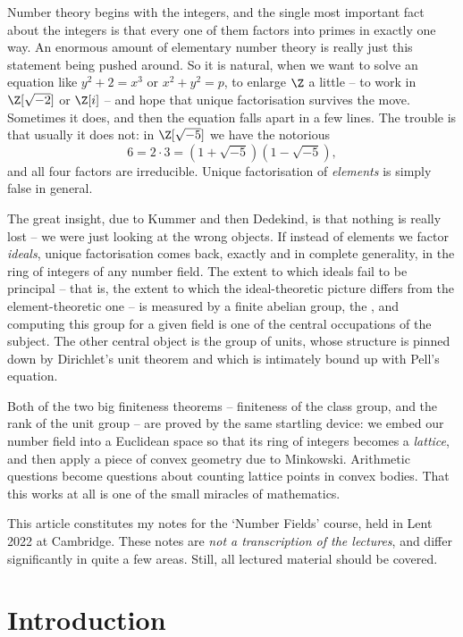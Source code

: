 



Number theory begins with the integers, and the single most important fact about the integers is that every one of them factors into primes in exactly one way. An enormous amount of elementary number theory is really just this statement being pushed around. So it is natural, when we want to solve an equation like $y^2 + 2 = x^3$ or $x^2 + y^2 = p$, to enlarge $\Z$ a little -- to work in $\Z[\sqrt{-2}]$ or $\Z[i]$ -- and hope that unique factorisation survives the move. Sometimes it does, and then the equation falls apart in a few lines. The trouble is that usually it does not: in $\Z[\sqrt{-5}]$ we have the notorious
$$6 = 2 \cdot 3 = (1 + \sqrt{-5})(1 - \sqrt{-5}),$$
and all four factors are irreducible. Unique factorisation of \emph{elements} is simply false in general.

The great insight, due to Kummer and then Dedekind, is that nothing is really lost -- we were just looking at the wrong objects. If instead of elements we factor \emph{ideals}, unique factorisation comes back, exactly and in complete generality, in the ring of integers of any number field. The extent to which ideals fail to be principal -- that is, the extent to which the ideal-theoretic picture differs from the element-theoretic one -- is measured by a finite abelian group, the , and computing this group for a given field is one of the central occupations of the subject. The other central object is the group of units, whose structure is pinned down by Dirichlet's unit theorem and which is intimately bound up with Pell's equation.

Both of the two big finiteness theorems -- finiteness of the class group, and the rank of the unit group -- are proved by the same startling device: we embed our number field into a Euclidean space so that its ring of integers becomes a \emph{lattice}, and then apply a piece of convex geometry due to Minkowski. Arithmetic questions become questions about counting lattice points in convex bodies. That this works at all is one of the small miracles of mathematics.

This article constitutes my notes for the `Number Fields' course, held in Lent 2022 at Cambridge. These notes are \emph{not a transcription of the lectures}, and differ significantly in quite a few areas. Still, all lectured material should be covered.



\section{Introduction}

